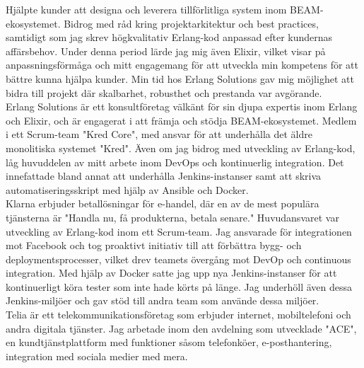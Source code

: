 \documentclass[purpleprocv]{procv}
\begin{document}
\begin{procv-twocolumns}
{          {Hjälpte kunder att designa och 
          leverera tillförlitliga system inom BEAM-ekosystemet. Bidrog med råd kring 
          projektarkitektur och best practices, samtidigt som jag skrev högkvalitativ 
          Erlang-kod anpassad efter kundernas affärsbehov. Under denna period lärde 
          jag mig även Elixir, vilket visar på anpassningsförmåga och mitt engagemang 
          för att utveckla min kompetens för att bättre kunna hjälpa kunder. Min tid 
          hos Erlang Solutions gav mig möjlighet att bidra till projekt där skalbarhet, 
          robusthet och prestanda var avgörande.
          \\[3pt]
          Erlang Solutions är ett konsultföretag välkänt för sin djupa expertis inom Erlang 
          och Elixir, och är engagerat i att främja och stödja BEAM-ekosystemet.}
          {Medlem i ett Scrum-team "Kred Core", med ansvar för att underhålla det äldre monolitiska 
          systemet "Kred". Även om jag bidrog med 
          utveckling av Erlang-kod, låg huvuddelen av mitt arbete inom DevOps och kontinuerlig 
          integration. Det innefattade bland annat att underhålla Jenkins-instanser samt 
          att skriva automatiseringsskript med hjälp av Ansible och Docker.
          \\[3pt]
          Klarna erbjuder betallösningar för e-handel, där en av de mest populära tjänsterna 
          är "Handla nu, få produkterna, betala senare."}
          {Huvudansvaret var utveckling av Erlang-kod inom ett Scrum-team. Jag ansvarade för 
          integrationen mot Facebook och tog proaktivt initiativ till att förbättra bygg- och 
          deploymentsprocesser, vilket drev teamets övergång mot DevOp och continuous 
          integration. Med hjälp av Docker satte jag upp nya Jenkins-instanser för att 
          kontinuerligt köra tester som inte hade körts på länge. Jag underhöll även dessa 
          Jenkins-miljöer och gav stöd till andra team som använde dessa miljöer.
          \\[3pt]
          Telia är ett telekommunikationsföretag som erbjuder internet, mobiltelefoni och 
          andra digitala tjänster. Jag arbetade inom den avdelning som utvecklade "ACE", 
          en kundtjänstplattform med funktioner såsom telefonköer, e-posthantering, 
          integration med sociala medier med mera.}
}
\end{procv-twocolumns}
\end{document}
